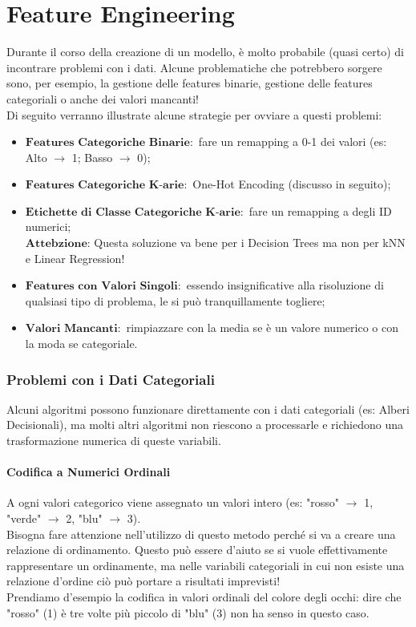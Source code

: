 \chapter{Feature Engineering}
    Durante il corso della creazione di un modello, è molto probabile (quasi certo) di incontrare problemi con i dati.
    Alcune problematiche che potrebbero sorgere sono, per esempio, la gestione delle features binarie, gestione delle features categoriali o anche dei valori mancanti!
    \\[2\baselineskip]
    Di seguito verranno illustrate alcune strategie per ovviare a questi problemi:
    \begin{itemize}
        \item $\textbf{Features Categoriche Binarie}:$ fare un remapping a 0-1 dei valori (es: Alto $\longrightarrow$ 1; Basso $\longrightarrow$ 0);
        \item $\textbf{Features Categoriche K-arie}:$ One-Hot Encoding (discusso in seguito);
        \item $\textbf{Etichette di Classe Categoriche K-arie}:$ fare un remapping a degli ID numerici;
            \\
            $\textbf{Attebzione:}$ Questa soluzione va bene per i Decision Trees ma non per kNN e Linear Regression!
        \item $\textbf{Features con Valori Singoli}:$ essendo insignificative alla risoluzione di qualsiasi tipo di problema, le si può tranquillamente togliere;
        \item $\textbf{Valori Mancanti}:$ rimpiazzare con la media se è un valore numerico o con la moda se categoriale.
    \end{itemize}

    \subsection{Problemi con i Dati Categoriali}
        Alcuni algoritmi possono funzionare direttamente con i dati categoriali (es: Alberi Decisionali), ma molti altri algoritmi non riescono a processarle e richiedono una trasformazione numerica di queste variabili.

        \subsubsection{Codifica a Numerici Ordinali}
            A ogni valori categorico viene assegnato un valori intero (es: "rosso" $\longrightarrow$ 1, "verde" $\longrightarrow$ 2, "blu" $\longrightarrow$ 3).
            \\[1\baselineskip]
            Bisogna fare attenzione nell'utilizzo di questo metodo perché si va a creare una relazione di ordinamento.
            Questo può essere d'aiuto se si vuole effettivamente rappresentare un ordinamente, ma nelle variabili categoriali in cui non esiste una relazione d'ordine ciò può portare a risultati imprevisti!
            \\
            Prendiamo d'esempio la codifica in valori ordinali del colore degli occhi: dire che "rosso" (1) è tre volte più piccolo di "blu" (3) non ha senso in questo caso.

